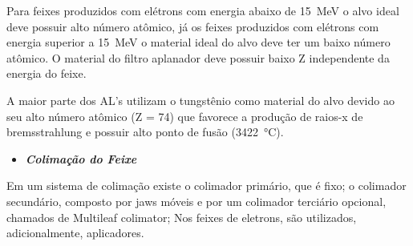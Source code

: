 \documentclass[11pt,a4paper]{article}
\begin{document}
                    Para feixes produzidos com elétrons com energia abaixo de \qty{15}{MeV} o alvo ideal deve possuir alto número atômico, já os feixes produzidos com elétrons com energia superior a \qty{15}{MeV} o material ideal do alvo deve ter um baixo número atômico. O material do filtro aplanador deve possuir baixo Z independente da energia do feixe.

                    A maior parte dos AL's utilizam o tungstênio como material do alvo devido ao seu alto número atômico (Z = 74) que favorece a produção de raios-x de bremsstrahlung e possuir alto ponto de fusão (\qty{3422}{\degreeCelsius}).

                    

                \begin{itemize}
                    \item \textbf{\textit{\textcolor{CarnationPink}{Colimação do Feixe}}}
                \end{itemize}

                    Em um sistema de colimação existe o colimador primário, que é fixo; o colimador secundário, composto por jaws móveis e por um colimador terciário opcional, chamados de Multileaf colimator; Nos feixes de eletrons, são utilizados, adicionalmente, aplicadores.
\end{document}
